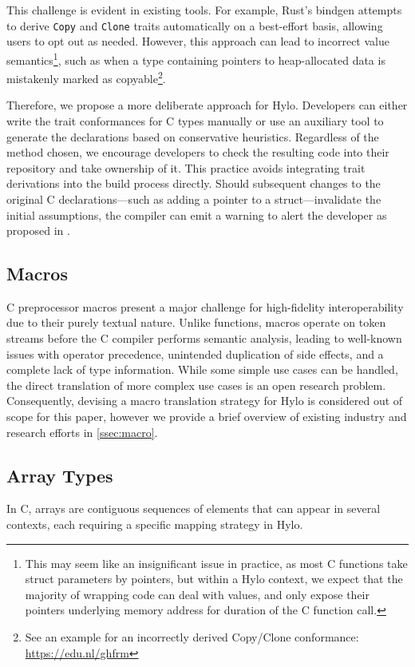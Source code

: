 This challenge is evident in existing tools. For example, Rust's bindgen attempts to derive \texttt{Copy} and \texttt{Clone} traits automatically on a best-effort basis, allowing users to opt out as needed\cite{bindgen-nocopy}. However, this approach can lead to incorrect value semantics\footnote{This may seem like an insignificant issue in practice, as most C functions take struct parameters by pointers, but within a Hylo context, we expect that the majority of wrapping code can deal with values, and only expose their pointers underlying memory address for duration of the C function call.}, such as when a type containing pointers to heap-allocated data is mistakenly marked as copyable\footnote{See an example for an incorrectly derived Copy/Clone conformance: \url{https://edu.nl/ghfrm}}.

Therefore, we propose a more deliberate approach for Hylo. Developers can either write the trait conformances for C types manually or use an auxiliary tool to generate the declarations based on conservative heuristics. Regardless of the method chosen, we encourage developers to check the resulting code into their repository and take ownership of it. This practice avoids integrating trait derivations into the build process directly. Should subsequent changes to the original C declarations—such as adding a pointer to a struct—invalidate the initial assumptions, the compiler can emit a warning to alert the developer as proposed in \cite{hylo-trait-ptr-conformance-warning}.

\subsection{Macros}
C preprocessor macros present a major challenge for high-fidelity interoperability due to their purely textual nature.  Unlike functions, macros operate on token streams before the C compiler performs semantic analysis, leading to well-known issues with operator precedence, unintended duplication of side effects, and a complete lack of type information.  While some simple use cases can be handled, the direct translation of more complex use cases is an open research problem. Consequently, devising a macro translation strategy for Hylo is considered out of scope for this paper, however we provide a brief overview of existing industry and research efforts in \autoref{ssec:macro}.

\subsection{Array Types}
In C, arrays are contiguous sequences of elements that can appear in several contexts\cite{carrays}, each requiring a specific mapping strategy in Hylo.

